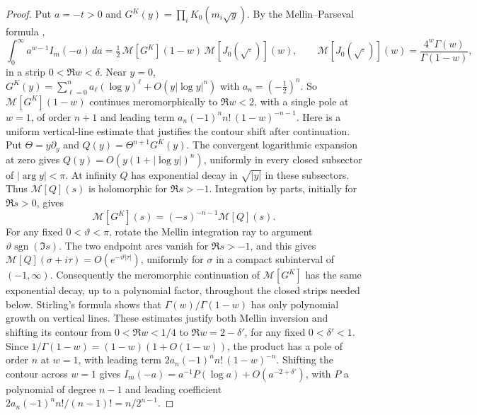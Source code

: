 \documentclass[11pt,a4paper]{article}
\theoremstyle{definition}
\theoremstyle{remark}
\numberwithin{equation}{section}
\begin{document}
\begin{proof}
Put $a=-t>0$ and $G^K(y)=\prod_iK_0(m_i\sqrt y)$. By the Mellin--Parseval formula \cite[Ch.~4]{BH86},
\[
\int_0^\infty a^{w-1}I_m(-a)\,da=\tfrac12\,\mathcal M[G^K](1-w)\,\mathcal M[J_0(\sqrt\cdot)](w),\qquad\mathcal M[J_0(\sqrt\cdot)](w)=\frac{4^w\Gamma(w)}{\Gamma(1-w)},
\]
in a strip $0<\Re w<\delta$. Near $y=0$, $G^K(y)=\sum_{\ell=0}^na_\ell(\log y)^\ell+O(y|\log y|^n)$ with $a_n=(-\frac12)^n$. So $\mathcal M[G^K](1-w)$ continues meromorphically to $\Re w<2$, with a single pole at $w=1$, of order $n+1$ and leading term $a_n(-1)^nn!\,(1-w)^{-n-1}$. Here is a uniform vertical-line estimate that justifies the contour shift after continuation. Put $\Theta=y\partial_y$ and $Q(y)=\Theta^{n+1}G^K(y)$. The convergent logarithmic expansion at zero gives $Q(y)=O(y(1+|\log y|)^n)$, uniformly in every closed subsector of $|\arg y|<\pi$. At infinity $Q$ has exponential decay in $\sqrt{|y|}$ in these subsectors. Thus $\mathcal M[Q](s)$ is holomorphic for $\Re s>-1$. Integration by parts, initially for $\Re s>0$, gives
\[
\mathcal M[G^K](s)=(-s)^{-n-1}\mathcal M[Q](s).
\]
For any fixed $0<\vartheta<\pi$, rotate the Mellin integration ray to argument $\vartheta\operatorname{sgn}(\Im s)$. The two endpoint arcs vanish for $\Re s>-1$, and this gives $\mathcal M[Q](\sigma+i\tau)=O(e^{-\vartheta|\tau|})$, uniformly for $\sigma$ in a compact subinterval of $(-1,\infty)$. Consequently the meromorphic continuation of $\mathcal M[G^K]$ has the same exponential decay, up to a polynomial factor, throughout the closed strips needed below. Stirling's formula shows that $\Gamma(w)/\Gamma(1-w)$ has only polynomial growth on vertical lines. These estimates justify both Mellin inversion and shifting its contour from $0<\Re w<1/4$ to $\Re w=2-\delta'$, for any fixed $0<\delta'<1$. Since $1/\Gamma(1-w)=(1-w)(1+O(1-w))$, the product has a pole of order $n$ at $w=1$, with leading term $2a_n(-1)^nn!\,(1-w)^{-n}$. Shifting the contour across $w=1$ gives $I_m(-a)=a^{-1}P(\log a)+O(a^{-2+\delta'})$, with $P$ a polynomial of degree $n-1$ and leading coefficient $2a_n(-1)^nn!/(n-1)!=n/2^{n-1}$.
\end{proof}
\end{document}
